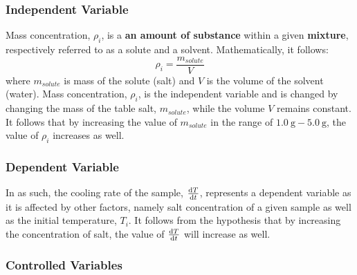 \documentclass[../main.tex]{subfiles}
\begin{document}
\doublespacing

\subsubsection{Independent Variable}

Mass concentration, $\rho_{i}$, is a \textbf{an amount of substance} within a given \textbf{mixture}, respectively referred to as a solute and a solvent. Mathematically, it follows:
\begin{equation} \label{eq:concentration}
    \rho_{i}= \frac{m_{solute}}{V}
\end{equation}
where $m_{solute}$ is mass of the solute (salt) and $V$ is the volume of the solvent (water). Mass concentration, $\rho_i$, is the independent variable and is changed by changing the mass of the table salt, $m_{solute}$, while the volume $V$ remains constant. It follows that by increasing the value of $m_{solute}$ in the range of $\SI{1.0}{\gram} - \SI{5.0}{\gram}$, the value of $\rho_i$ increases as well. %

\subsubsection{Dependent Variable}

In as such, the cooling rate of the sample, $\dv{T}{t}$, represents a dependent variable as it is affected by other factors, namely salt concentration of a given sample as well as the initial temperature, $T_i$. It follows from the hypothesis that by increasing the concentration of salt, the value of $\dv{T}{t}$ will increase as well.


\subsubsection{Controlled Variables}
\end{document}
